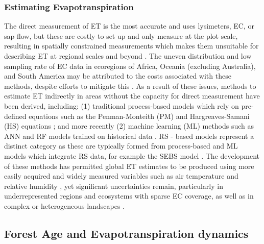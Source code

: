 \subsubsection{Estimating Evapotranspiration}
\par The direct measurement of ET is the most accurate and uses lysimeters, \ac{EC}, or sap flow, but these are costly to set up and only measure at the plot scale, resulting in spatially constrained measurements which makes them unsuitable for describing ET at regional scales and beyond \parencite{amani2023review,liyew2025review}. The uneven distribution and low sampling rate of EC data in ecoregions of Africa, Oceania (excluding Australia), and South America may be attributed to the costs associated with these methods, despite efforts to mitigate this \parencite{hill2017, markwitz2019low}. As a result of these issues, methods to estimate ET indirectly in areas without the capacity for direct measurement have been derived, including: (1) traditional process-based models which rely on pre-defined equations such as the Penman-Monteith (PM) and Hargreaves-Samani (HS) equations \parencite{monteith1965evaporation, hargreaves1985reference}; and more recently (2) machine learning (ML) methods such as \ac{ANN} and \ac{RF} models trained on historical data \parencite{xu2018evaluating}. \ac{RS} - based models represent a distinct category as these are typically formed from process-based and ML models which integrate RS data, for example the SEBS model \parencite{su2002surface}. The development of these methods has permitted global ET estimates to be produced using more easily acquired and widely measured variables such as air temperature and relative humidity \parencite{pan2020evaluation}, yet significant uncertainties remain, particularly in underrepresented regions and ecosystems with sparse EC coverage, as well as in complex or heterogeneous landscapes \parencite{xu2018evaluating, amani2023review}.

\subsection{Forest Age and Evapotranspiration dynamics}
